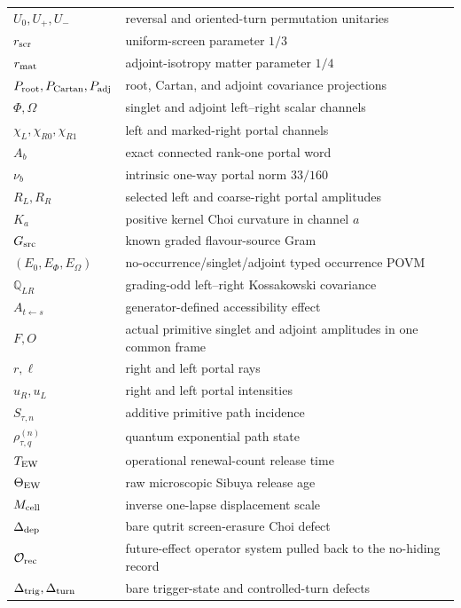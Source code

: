 \documentclass[11pt,oneside,openany]{book}
\numberwithin{equation}{chapter}
\theoremstyle{definition}
\theoremstyle{remark}
\newcommand{\Qocc}{\mathbb Q_{LR}}
\begin{document}
\begin{longtable}{@{}p{}p{}@{}}
\(U_0,U_+,U_-\) & reversal and oriented-turn permutation unitaries\\
\(r_{\rm scr}\) & uniform-screen parameter \(1/3\)\\
\(r_{\rm mat}\) & adjoint-isotropy matter parameter \(1/4\)\\
\(P_{\rm root},P_{\rm Cartan},P_{\rm adj}\) & root, Cartan, and adjoint covariance projections\\
\(\Phi,\Omega\) & singlet and adjoint left--right scalar channels\\
\(\chi_L,\chi_{R0},\chi_{R1}\) & left and marked-right portal channels\\
\(A_b\) & exact connected rank-one portal word\\
\(\nu_b\) & intrinsic one-way portal norm \(33/160\)\\
\(R_L,R_R\) & selected left and coarse-right portal amplitudes\\
\(K_a\) & positive kernel Choi curvature in channel \(a\)\\
\(G_{\rm src}\) & known graded flavour-source Gram\\
\((E_0,E_\Phi,E_\Omega)\) & no-occurrence/singlet/adjoint typed occurrence POVM\\
\(\Qocc\) & grading-odd left--right Kossakowski covariance\\
\(A_{t\leftarrow s}\) & generator-defined accessibility effect\\
\(F,O\) & actual primitive singlet and adjoint amplitudes in one common frame\\
\(r,\ell\) & right and left portal rays\\
\(u_R,u_L\) & right and left portal intensities\\
\(S_{\tau,n}\) & additive primitive path incidence\\
\(\rho_{\tau,q}^{(n)}\) & quantum exponential path state\\
\(T_{\rm EW}\) & operational renewal-count release time\\
\(\Theta_{\rm EW}\) & raw microscopic Sibuya release age\\
\(M_{\rm cell}\) & inverse one-lapse displacement scale\\
\(\Delta_{\rm dep}\) & bare qutrit screen-erasure Choi defect\\
\(\mathcal O_{\rm rec}\) & future-effect operator system pulled back to the no-hiding record\\
\(\Delta_{\rm trig},\Delta_{\rm turn}\) & bare trigger-state and controlled-turn defects\\
\bottomrule
\end{longtable}
\end{document}
